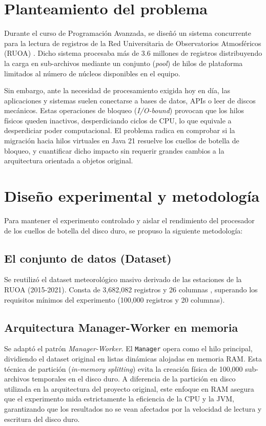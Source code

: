 \documentclass[12pt,a4paper]{article}
\begin{document}
\section{Planteamiento del problema}
Durante el curso de Programación Avanzada, se diseñó un sistema concurrente para la lectura de registros de la Red Universitaria de Observatorios Atmosféricos (RUOA) \cite{repo2023}. Dicho sistema procesaba más de 3.6 millones de registros distribuyendo la carga en sub-archivos mediante un conjunto (\textit{pool}) de hilos de plataforma limitados al número de núcleos disponibles en el equipo.

Sin embargo, ante la necesidad de procesamiento exigida hoy en día, las aplicaciones y sistemas suelen conectarse a bases de datos, APIs o leer de discos mecánicos. Estas operaciones de bloqueo (\textit{I/O-bound}) provocan que los hilos físicos queden inactivos, desperdiciando ciclos de CPU, lo que equivale a desperdiciar poder computacional. El problema radica en comprobar si la migración hacia hilos virtuales en Java 21 resuelve los cuellos de botella de bloqueo, y cuantificar dicho impacto sin requerir grandes cambios a la arquitectura orientada a objetos original.

\section{Diseño experimental y metodología}
Para mantener el experimento controlado y aislar el rendimiento del procesador de los cuellos de botella del disco duro, se propuso la siguiente metodología:

\subsection{El conjunto de datos (Dataset)}
Se reutilizó el dataset meteorológico masivo derivado de las estaciones de la RUOA (2015-2021). Consta de 3,682,082 registros y 26 columnas \cite{repo2023}, superando los requisitos mínimos del experimento (100,000 registros y 20 columnas).

\subsection{Arquitectura Manager-Worker en memoria}
Se adaptó el patrón \textit{Manager-Worker}. El \texttt{Manager} opera como el hilo principal, dividiendo el dataset original en listas dinámicas alojadas en memoria RAM. Esta técnica de partición (\textit{in-memory splitting}) evita la creación física de 100,000 sub-archivos temporales en el disco duro. A diferencia de la partición en disco utilizada en la arquitectura del proyecto original, este enfoque en RAM asegura que el experimento mida estrictamente la eficiencia de la CPU y la JVM, garantizando que los resultados no se vean afectados por la velocidad de lectura y escritura del disco duro.
\end{document}
